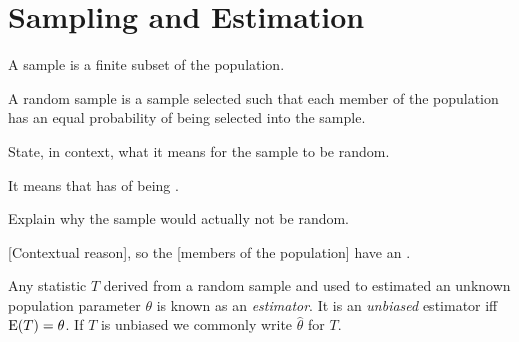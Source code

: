 \chapter{Sampling and Estimation}
\begin{definition}{}{}
  A sample is a finite subset of the population.
\end{definition}
\begin{definition}{}{}
  A random sample is a sample selected such that each member of the population has an equal probability of being selected into the sample.
\end{definition}
\begin{note}
  State, in context, what it means for the sample to be random.
  \begin{center}
    \parbox{0.9\textwidth}{
      It means that  has  of being . 
    }
  \end{center}
\end{note}
\begin{note}
  Explain why the sample would actually not be random.
  \begin{center}
    \parbox{0.9\textwidth}{
      [Contextual reason], so  the [members of the population] have an . 
    }
  \end{center}
\end{note}
\begin{definition}{}{}
  Any statistic \(T\) derived from a random sample and used to estimated an unknown population parameter \(\theta\) is known as an \emph{estimator}. It is an \emph{unbiased} estimator iff \(\operatorname{E}(T)=\theta\). If \(T\) is unbiased we commonly write \(\hat{\theta}\) for \(T\).
\end{definition}

